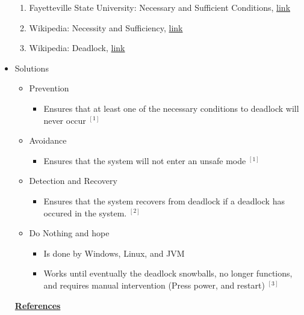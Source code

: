 \documentclass[12pt]{article}
\begin{document}
\begin{itemize}
    \begin{enumerate}[1)]
        \item Fayetteville State University: Necessary and Sufficient Conditions, \href{http://faculty.uncfsu.edu/jyoung/necessary_and_sufficient_conditions.htm}{link}
        \item Wikipedia: Necessity and Sufficiency, \href{https://en.wikipedia.org/wiki/Necessity_and_sufficiency}{link}
        \item Wikipedia: Deadlock, \href{https://en.wikipedia.org/wiki/Deadlock#Necessary_conditions}{link}
    \end{enumerate}
    \item Solutions
    \begin{itemize}
        \item Prevention
        \begin{itemize}
            \item Ensures that at least one of the necessary conditions to deadlock
            will never occur $^{[1]}$
        \end{itemize}
        \item Avoidance
        \begin{itemize}
            \item Ensures that the system will not enter an unsafe mode $^{[1]}$
        \end{itemize}
        \item Detection and Recovery
        \begin{itemize}
            \item Ensures that the system recovers from deadlock if a deadlock has
            occured in the system. $^{[2]}$
        \end{itemize}
        \item Do Nothing and hope
        \begin{itemize}
            \item Is done by Windows, Linux, and JVM
            \item Works until eventually the deadlock snowballs, no longer functions,
            and requires manual intervention (Press power, and restart) $^{[3]}$
        \end{itemize}
    \end{itemize}

    \bigskip

    \underline{\textbf{References}}

    \bigskip


\end{itemize}
\end{document}
